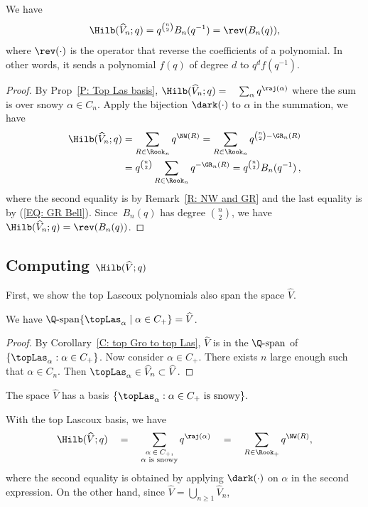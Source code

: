 \begin{prop}
\label{T: F_n}
We have
$$
\Hilb(\widehat{V}_n;q) 
= q^{{\binom{n}{2}}} B_{n}(q^{-1})
= \rev(B_n(q)),
$$
where $\rev(\cdot)$ is the operator that
reverse the coefficients of a polynomial.
In other words, it sends a polynomial $f(q)$
of degree $d$ to $q^d f(q^{-1})$.
\end{prop}
\begin{proof}

By Prop~\ref{P: Top Las basis},
$
\Hilb(\widehat{V}_n;q) = \quad \sum_{\alpha} q^{\raj(\alpha)}$
where the sum is over snowy $\alpha \in C_n$.
Apply the bijection $\dark(\cdot)$
to $\alpha$ in the summation, we have
\begin{align*}
\Hilb(\widehat{V}_n;q) & = \sum_{R \in \Rook_n} q^{\NW(R)} =\sum_{R \in \Rook_n} q^{{\binom{n}{2}} - \GR_n(R)}\\
&=q^{\binom{n}{2}}\sum_{R \in \Rook_n} q^{-\GR_n(R)} = q^{{\binom{n}{2}}} B_{n}(q^{-1})\,,
\end{align*}
where the second equality is by 
Remark~\ref{R: NW and GR}
and the last equality is by (\ref{EQ: GR Bell}).
Since~$B_n(q)$ has degree ${\binom{n}{2}}$, we have $\Hilb(\widehat{V}_n;q) = \rev(B_n(q))$.
\end{proof}

\subsection{Computing  \texorpdfstring{$\Hilb(\widehat{V};q)$}{TEXT}}\label{subsec.v.hat}

First, we show the top Lascoux polynomials also span the space $\widehat{V}$.
\begin{prop}
\label{P: V span}
We have $\Q\textrm{-span}\{\topLas_\alpha \mid \alpha \in C_+\} = \widehat{V}$.
\end{prop}
\begin{proof}
By Corollary~\ref{C: top Gro to top Las},
$\widehat{V}$ is in the $\Q\textrm{-span}$ of 
$\{\topLas_\alpha: \alpha \in C_+\}$.
Now consider $\alpha \in C_+$.
There exists $n$ large enough such that
$\alpha \in C_n$.
Then $\topLas_\alpha \in \widehat{V}_n \subset \widehat{V}$.
\end{proof}

\begin{cor}
The space $\widehat{V}$
has a basis 
$\{ \topLas_\alpha: \alpha \in C_+ \textrm{ is snowy}\}.$
\end{cor}

With the top Lascoux basis, we have
$$
\Hilb(\widehat{V};q)  \quad = \quad \sum_{\substack{\alpha \: \in \: C_+, \\ 
\alpha \textrm{ is snowy}}} q^{\raj(\alpha)} \quad
= \quad \sum_{R \in \Rook_+} q^{\NW(R)},$$
where the second equality is obtained by 
applying $\dark(\cdot)$ on $\alpha$ in the second expression.
On the other hand, since $\widehat{V} = \bigcup_{n \geq 1} \widehat{V}_n$, 

